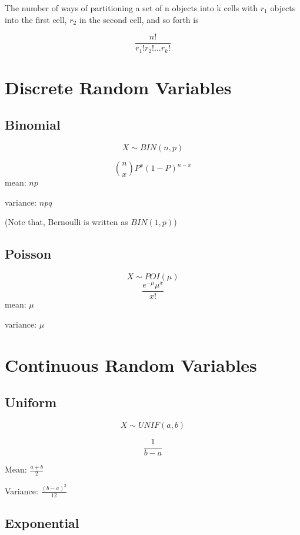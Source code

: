 \documentclass[
]{book}
\begin{document}
The number of ways of partitioning a set of n objects into k cells with \(r_1\) objects into the first cell, \(r_2\) in the second cell, and so forth is

\[\frac{n!}{r_1! r_2! ...r_k!}\]

\hypertarget{discrete-random-variables}{%
\section{Discrete Random Variables}\label{discrete-random-variables}}

\hypertarget{binomial}{%
\subsection{Binomial}\label{binomial}}

\[X\sim BIN(n,p)\]

\[\binom{n}{x}P^x(1-P)^{n-x}\]
mean: \(np\)

variance: \(npq\)

(Note that, Bernoulli is written as \(BIN(1, p)\))

\hypertarget{poisson}{%
\subsection{Poisson}\label{poisson}}

\[X \sim POI(\mu)\]
\[\frac{e^{-\mu}\mu^x}{x!}\]
mean: \(\mu\)

variance: \(\mu\)

\hypertarget{continuous-random-variables}{%
\section{Continuous Random Variables}\label{continuous-random-variables}}

\hypertarget{uniform}{%
\subsection{Uniform}\label{uniform}}

\[X \sim UNIF(a,b)\]

\[\frac{1}{b-a}\]

Mean: \(\frac{a+b}{2}\)

Variance: \(\frac{(b-a)^2}{12}\)

\hypertarget{exponential}{%
\subsection{Exponential}\label{exponential}}
\end{document}
